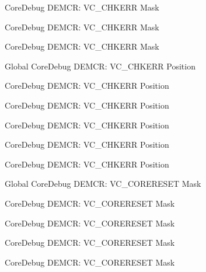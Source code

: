 \begin{DoxyRefList}
\label{deprecated__deprecated000617}%
%
Core\+Debug DEMCR\+: VC\+\_\+\+CHKERR Mask 

\label{deprecated__deprecated000426}%
%
Core\+Debug DEMCR\+: VC\+\_\+\+CHKERR Mask 

\label{deprecated__deprecated000515}%
%
Core\+Debug DEMCR\+: VC\+\_\+\+CHKERR Mask  
\item[Global \doxylink{group___c_m_s_i_s___core_debug_ga10fc7c53bca904c128bc8e1a03072d50}{Core\+Debug\+\_\+\+DEMCR\+\_\+\+VC\+\_\+\+CHKERR\+\_\+\+Pos} ]\label{deprecated__deprecated000349}%
%
Core\+Debug DEMCR\+: VC\+\_\+\+CHKERR Position 

\label{deprecated__deprecated000425}%
%
Core\+Debug DEMCR\+: VC\+\_\+\+CHKERR Position 

\label{deprecated__deprecated000207}%
%
Core\+Debug DEMCR\+: VC\+\_\+\+CHKERR Position 

\label{deprecated__deprecated000616}%
%
Core\+Debug DEMCR\+: VC\+\_\+\+CHKERR Position 

\label{deprecated__deprecated000514}%
%
Core\+Debug DEMCR\+: VC\+\_\+\+CHKERR Position 

\label{deprecated__deprecated000063}%
%
Core\+Debug DEMCR\+: VC\+\_\+\+CHKERR Position  
\item[Global \doxylink{group___c_m_s_i_s___core_debug_ga906476e53c1e1487c30f3a1181df9e30}{Core\+Debug\+\_\+\+DEMCR\+\_\+\+VC\+\_\+\+CORERESET\+\_\+\+Msk} ]\label{deprecated__deprecated000138}%
%
Core\+Debug DEMCR\+: VC\+\_\+\+CORERESET Mask 

\label{deprecated__deprecated000432}%
%
Core\+Debug DEMCR\+: VC\+\_\+\+CORERESET Mask 

\label{deprecated__deprecated000214}%
%
Core\+Debug DEMCR\+: VC\+\_\+\+CORERESET Mask 

\label{deprecated__deprecated000356}%
%
Core\+Debug DEMCR\+: VC\+\_\+\+CORERESET Mask 

\label{deprecated__deprecated000070}%
%
Core\+Debug DEMCR\+: VC\+\_\+\+CORERESET Mask 


\end{DoxyRefList}
